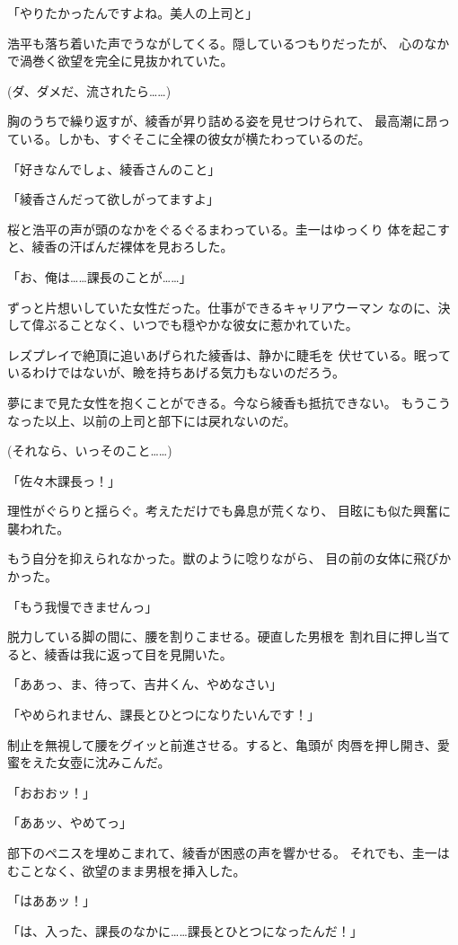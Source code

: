 ﻿\documentclass[
    book,tate,
    line_length=30zw,
    jafontsize=12pt,
    paper=b5j,
    landscape,
    ]{jlreq}
\begin{document}
「やりたかったんですよね。美人の上司と」

浩平も落ち着いた声でうながしてくる。隠しているつもりだったが、
心のなかで渦巻く欲望を完全に見抜かれていた。

(ダ、ダメだ、流されたら……)

胸のうちで繰り返すが、綾香が昇り詰める姿を見せつけられて、
最高潮に昂っている。しかも、すぐそこに全裸の彼女が横たわっているのだ。

「好きなんでしょ、綾香さんのこと」

「綾香さんだって欲しがってますよ」

桜と浩平の声が頭のなかをぐるぐるまわっている。圭一はゆっくり
体を起こすと、綾香の汗ばんだ裸体を見おろした。

「お、俺は……課長のことが……」

ずっと片想いしていた女性だった。仕事ができるキャリアウーマン
なのに、決して偉ぶることなく、いつでも穏やかな彼女に惹かれていた。

レズプレイで絶頂に追いあげられた綾香は、静かに睫毛を
伏せている。眠っているわけではないが、瞼を持ちあげる気力もないのだろう。

夢にまで見た女性を抱くことができる。今なら綾香も抵抗できない。
もうこうなった以上、以前の上司と部下には戻れないのだ。

(それなら、いっそのこと……)

「佐々木課長っ！」

理性がぐらりと揺らぐ。考えただけでも鼻息が荒くなり、
目眩にも似た興奮に襲われた。

もう自分を抑えられなかった。獣のように唸りながら、
目の前の女体に飛びかかった。

「もう我慢できませんっ」

脱力している脚の間に、腰を割りこませる。硬直した男根を
割れ目に押し当てると、綾香は我に返って目を見開いた。

「ああっ、ま、待って、吉井くん、やめなさい」

「やめられません、課長とひとつになりたいんです！」

制止を無視して腰をグイッと前進させる。すると、亀頭が
肉唇を押し開き、愛蜜をえた女壺に沈みこんだ。

「おおおッ！」

「ああッ、やめてっ」

部下のペニスを埋めこまれて、綾香が困惑の声を響かせる。
それでも、圭一はむことなく、欲望のまま男根を挿入した。

「はああッ！」

「は、入った、課長のなかに……課長とひとつになったんだ！」
\end{document}

